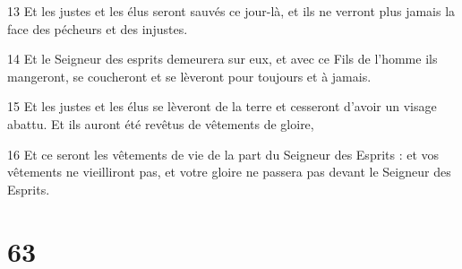 \par 13 Et les justes et les élus seront sauvés ce jour-là, et ils ne verront plus jamais la face des pécheurs et des injustes.
\par 14 Et le Seigneur des esprits demeurera sur eux, et avec ce Fils de l'homme ils mangeront, se coucheront et se lèveront pour toujours et à jamais.
\par 15 Et les justes et les élus se lèveront de la terre et cesseront d'avoir un visage abattu. Et ils auront été revêtus de vêtements de gloire,
\par 16 Et ce seront les vêtements de vie de la part du Seigneur des Esprits : et vos vêtements ne vieilliront pas, et votre gloire ne passera pas devant le Seigneur des Esprits.

\chapter{63}

